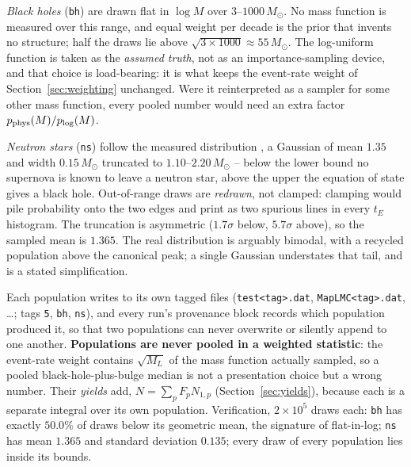 \documentclass[english,10pt,a4paper]{article}
\begin{document}
	\emph{Black holes} (\texttt{bh}) are drawn flat in $\log M$ over $3$--$1000\,M_\odot$. No mass function is measured over this range, and equal weight per decade is the prior that invents no structure; half the draws lie above $\sqrt{3\times1000}\approx55\,M_\odot$. The log-uniform function is taken as the \emph{assumed truth}, not as an importance-sampling device, and that choice is load-bearing: it is what keeps the event-rate weight of Section~\ref{sec:weighting} unchanged. Were it reinterpreted as a sampler for some other mass function, every pooled number would need an extra factor $p_{\rm phys}(M)/p_{\rm log}(M)$.

	\emph{Neutron stars} (\texttt{ns}) follow the measured distribution \cite{OzelFreire2016}, a Gaussian of mean $1.35$ and width $0.15\,M_\odot$ truncated to $1.10$--$2.20\,M_\odot$ -- below the lower bound no supernova is known to leave a neutron star, above the upper the equation of state gives a black hole. Out-of-range draws are \emph{redrawn}, not clamped: clamping would pile probability onto the two edges and print as two spurious lines in every $t_E$ histogram. The truncation is asymmetric ($1.7\sigma$ below, $5.7\sigma$ above), so the sampled mean is $1.365$. The real distribution is arguably bimodal, with a recycled population above the canonical peak; a single Gaussian understates that tail, and is a stated simplification.

	Each population writes to its own tagged files (\texttt{test<tag>.dat}, \texttt{MapLMC<tag>.dat}, \ldots; tags \texttt{5}, \texttt{bh}, \texttt{ns}), and every run's provenance block records which population produced it, so that two populations can never overwrite or silently append to one another. \textbf{Populations are never pooled in a weighted statistic}: the event-rate weight contains $\sqrt{M_L}$ of the mass function actually sampled, so a pooled black-hole-plus-bulge median is not a presentation choice but a wrong number. Their \emph{yields} add, $N = \sum_p F_p N_{1,p}$ (Section~\ref{sec:yields}), because each is a separate integral over its own population. Verification, $2\times10^5$ draws each: \texttt{bh} has exactly $50.0\%$ of draws below its geometric mean, the signature of flat-in-log; \texttt{ns} has mean $1.365$ and standard deviation $0.135$; every draw of every population lies inside its bounds.
\end{document}
